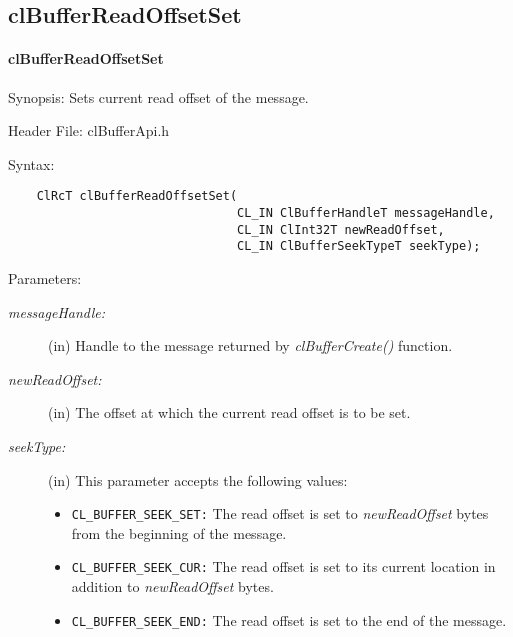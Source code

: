 \subsection{clBufferReadOffsetSet}
\hypertarget{pagebuf119}{}\paragraph{cl\-Buffer\-Read\-Offset\-Set}\label{pagebuf119}
\begin{Desc}
\item[Synopsis:]Sets current read offset of the message.\end{Desc}
\begin{Desc}
\item[Header File:]clBufferApi.h\end{Desc}
\begin{Desc}
\item[Syntax:]

\footnotesize\begin{verbatim}    ClRcT clBufferReadOffsetSet(
                         		CL_IN ClBufferHandleT messageHandle,
                         		CL_IN ClInt32T newReadOffset,
                         		CL_IN ClBufferSeekTypeT seekType);
\end{verbatim}
\normalsize
\end{Desc}
\begin{Desc}
\item[Parameters:]
\begin{description}
\item[{\em message\-Handle:}](in) Handle to the message returned by \textit{clBufferCreate()} function.
\item[{\em new\-Read\-Offset:}](in) The offset at which the current read offset is to be set. 
\item[{\em seek\-Type:}](in) This parameter accepts the following values: \begin{itemize}
	\item {\tt CL\_\-BUFFER\_\-SEEK\_\-SET:} The read offset is set to {\em new\-Read\-Offset\/} bytes from the beginning of the message. 
	\item {\tt CL\_\-BUFFER\_\-SEEK\_\-CUR:} The read offset is set to its current location in addition to {\em new\-Read\-Offset\/} bytes. 
	\item {\tt CL\_\-BUFFER\_\-SEEK\_\-END:} The read offset is set to the end of the message.\end{itemize}
\end{description}
\end{Desc}
